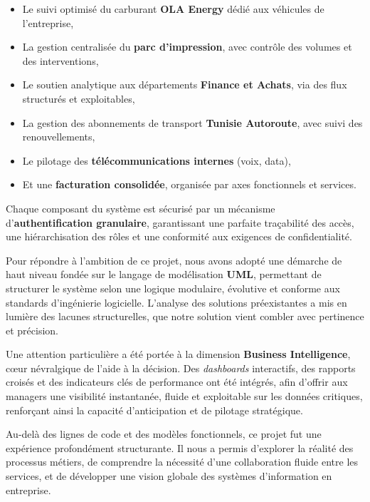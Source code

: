 \documentclass[a4paper,11pt]{report}
\begin{document}
\vspace{0.3cm}
\begin{itemize}
    \item Le suivi optimisé du carburant \textbf{OLA Energy} dédié aux véhicules de l’entreprise,
    \item La gestion centralisée du \textbf{parc d’impression}, avec contrôle des volumes et des interventions,
    \item Le soutien analytique aux départements \textbf{Finance et Achats}, via des flux structurés et exploitables,
    \item La gestion des abonnements de transport \textbf{Tunisie Autoroute}, avec suivi des renouvellements,
    \item Le pilotage des \textbf{télécommunications internes} (voix, data),
    \item Et une \textbf{facturation consolidée}, organisée par axes fonctionnels et services.
\end{itemize}

\vspace{0.3cm}
\noindent
Chaque composant du système est sécurisé par un mécanisme d’\textbf{authentification granulaire}, garantissant une parfaite traçabilité des accès, une hiérarchisation des rôles et une conformité aux exigences de confidentialité.

\vspace{0.4cm}
\noindent
Pour répondre à l’ambition de ce projet, nous avons adopté une démarche de haut niveau fondée sur le langage de modélisation \textbf{UML}, permettant de structurer le système selon une logique modulaire, évolutive et conforme aux standards d’ingénierie logicielle. L’analyse des solutions préexistantes a mis en lumière des lacunes structurelles, que notre solution vient combler avec pertinence et précision.

\vspace{0.4cm}
\noindent
Une attention particulière a été portée à la dimension \textbf{Business Intelligence}, cœur névralgique de l’aide à la décision. Des \textit{dashboards} interactifs, des rapports croisés et des indicateurs clés de performance ont été intégrés, afin d’offrir aux managers une visibilité instantanée, fluide et exploitable sur les données critiques, renforçant ainsi la capacité d’anticipation et de pilotage stratégique.

\vspace{0.4cm}
\noindent
Au-delà des lignes de code et des modèles fonctionnels, ce projet fut une expérience profondément structurante. Il nous a permis d’explorer la réalité des processus métiers, de comprendre la nécessité d’une collaboration fluide entre les services, et de développer une vision globale des systèmes d’information en entreprise.
\end{document}
